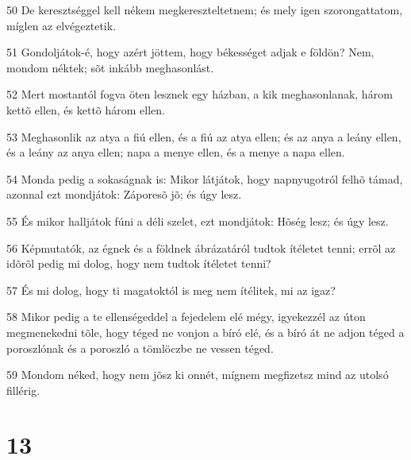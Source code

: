 \par 50 De keresztséggel kell nékem megkereszteltetnem; és  mely igen szorongattatom, míglen az elvégeztetik.
\par 51 Gondoljátok-é, hogy azért jöttem, hogy békességet adjak e földön? Nem, mondom néktek; sõt inkább meghasonlást.
\par 52 Mert mostantól fogva öten lesznek egy házban, a kik meghasonlanak, három kettõ ellen, és kettõ három ellen.
\par 53 Meghasonlik az atya a fiú ellen, és a fiú az atya ellen; és az anya a leány ellen, és a leány az anya ellen; napa a menye ellen, és a menye a napa ellen.
\par 54 Monda pedig a sokaságnak is: Mikor látjátok, hogy napnyugotról felhõ támad, azonnal ezt mondjátok: Záporesõ jõ; és úgy lesz.
\par 55 És mikor halljátok fúni a déli szelet, ezt mondjátok: Hõség lesz; és úgy lesz.
\par 56 Képmutatók, az égnek és a földnek ábrázatáról tudtok ítéletet tenni; errõl az idõrõl pedig mi dolog, hogy nem tudtok ítéletet tenni?
\par 57 És mi dolog, hogy ti magatoktól is meg nem ítélitek, mi az igaz?
\par 58 Mikor pedig a te ellenségeddel a fejedelem elé mégy, igyekezzél az úton megmenekedni tõle, hogy téged ne vonjon a bíró elé, és a bíró át ne adjon téged a poroszlónak és a poroszló a tömlöczbe ne vessen téged.
\par 59 Mondom néked, hogy nem jõsz ki onnét, mígnem megfizetsz mind az utolsó fillérig.

\chapter{13}

